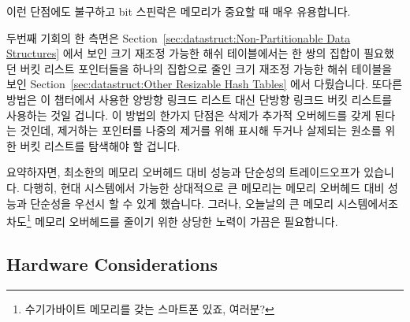 이런 단점에도 불구하고 bit 스핀락은 메모리가 중요할 때 매우 유용합니다.

두번째 기회의 한 측면은
Section~\ref{sec:datastruct:Non-Partitionable Data Structures} 에서 보인 크기
재조정 가능한 해쉬 테이블에서는 한 쌍의 집합이 필요했던 버킷 리스트 포인터들을
하나의 집합으로 줄인 크기 재조정 가능한 해쉬 테이블을 보인
Section~\ref{sec:datastruct:Other Resizable Hash Tables} 에서 다뤘습니다.
또다른 방법은 이 챕터에서 사용한 양방향 링크드 리스트 대신 단방향 링크드 버킷
리스트를 사용하는 것일 겁니다.
이 방법의 한가지 단점은 삭제가 추가적 오버헤드를 갖게 된다는 것인데, 제거하는
포인터를 나중의 제거를 위해 표시해 두거나 살제되는 원소를 위한 버킷 리스트를
탐색해야 할 겁니다.

요약하자면, 최소한의 메모리 오버헤드 대비 성능과 단순성의 트레이드오프가
있습니다.
다행히, 현대 시스템에서 가능한 상대적으로 큰 메모리는 메모리 오버헤드 대비
성능과 단순성을 우선시 할 수 있게 했습니다.
그러나, 오늘날의 큰 메모리 시스템에서조차도\footnote{
	수기가바이트 메모리를 갖는 스마트폰 있죠, 여러분?}
메모리 오버헤드를 줄이기 위한 상당한 노력이 가끔은 필요합니다.

\subsection{Hardware Considerations}
\label{sec:datastruct:Hardware Considerations}

